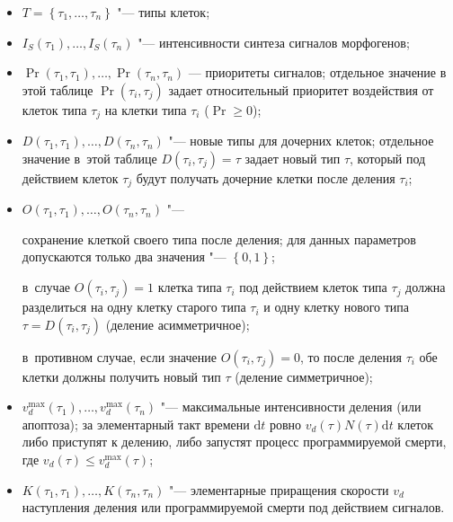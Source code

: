 \begin{itemize} 

	\item $T = \left\lbrace \tau_{1},  \dots , \tau_{n} \right\rbrace$ "--- типы клеток;

	\item $I_{S}(\tau_{1}),  \dots  , I_{S}(\tau_{n})$ "--- интенсивности синтеза сигналов морфогенов;

	\item $\operatorname{Pr}(\tau_{1},\tau_{1}), \dots  ,\operatorname{Pr}(\tau_{n},\tau_{n})$ --- приоритеты сигналов; отдельное значение в этой таблице $\operatorname{Pr}(\tau_{i},\tau_{j})$ задает относительный приоритет воздействия от клеток типа $\tau_{j}$ на клетки типа $\tau_{i}$ ($\operatorname{Pr} \geq 0$);

	\item $D(\tau_{1},\tau_{1}), \dots  ,D(\tau_{n},\tau_{n})$ "--- новые типы для дочерних клеток; отдельное значение в~этой таблице $D(\tau_{i},\tau_{j}) = \tau$ задает новый тип $\tau$, который  под действием клеток $\tau_{j}$ будут получать дочерние клетки после деления $\tau_{i}$;

	\item $O(\tau_{1},\tau_{1}), \dots  ,O(\tau_{n},\tau_{n})$ "--- 

сохранение клеткой своего типа после деления; для данных параметров допускаются только два значения "--- $\left\lbrace 0, 1 \right\rbrace$; 

в~случае $O(\tau_{i},\tau_{j})=1$ клетка типа $\tau_{i}$ под действием клеток типа $\tau_{j}$ должна разделиться на одну клетку старого типа $\tau_{i}$ и одну клетку нового типа $\tau =D(\tau_{i},\tau_{j})$ (деление асимметричное);

в~противном случае, если значение $O(\tau_{i},\tau_{j})=0$, то после деления $\tau_{i}$ обе клетки должны получить новый тип $\tau$ (деление симметричное);

	\item $v_{d}^{\max}(\tau_{1}),  \dots  , v_{d}^{\max}(\tau_{n})$ "--- максимальные интенсивности  деления (или \linebreak апоп\-тоза); за элементарный такт времени $\mathrm{d}t$ ровно $v_{d}(\tau) N(\tau) \mathrm{d}t$ клеток  либо приступят к делению, либо запустят процесс программируемой смерти, где $v_{d}(\tau) \leq v_{d}^{\max}(\tau) $;

	\item $K(\tau_{1},\tau_{1}), \dots  ,K(\tau_{n},\tau_{n})$ "--- элементарные 	приращения скорости $v_{d}$ наступления 	деления или программируемой смерти под действием сигналов. 	

\end{itemize}

